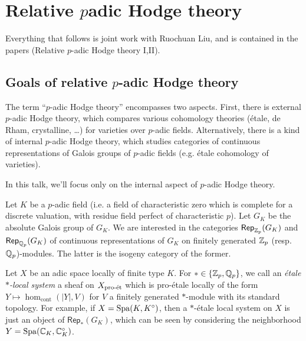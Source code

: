 




\section{Relative \texorpdfstring{$p$}-adic Hodge theory}





Everything that follows is joint work with Ruochuan Liu, and is contained 
in the papers (Relative $p$-adic Hodge theory I,II). 




\subsection{Goals of relative \texorpdfstring{$p$}{p}-adic Hodge theory}

The term ``$p$-adic Hodge theory'' encompasses two aspects. First, there is 
external $p$-adic Hodge theory, which compares various cohomology theories 
(\'etale, de Rham, crystalline, \ldots) for varieties over $p$-adic fields. 
Alternatively, there is a kind of internal $p$-adic Hodge theory, which studies 
categories of continuous representations of Galois groups of $p$-adic fields 
(e.g. \'etale cohomology of varieties). 

In this talk, we'll focus only on the internal aspect of $p$-adic Hodge theory. 

Let $K$ be a $p$-adic field (i.e. a field of characteristic zero which is complete 
for a discrete valuation, with residue field perfect of characteristic $p$). 
Let $G_K$ be the absolute Galois group of $G_K$. We are interested in the categories 
$\mathsf{Rep}_{\mathbb{Z}_p}(G_K)$ and $\mathsf{Rep}_{\mathbb{Q}_p}(G_K)$ of continuous 
representations of $G_K$ on finitely generated $\mathbb{Z}_p$ (resp. $\mathbb{Q}_p$)-modules. 
The latter is the isogeny category of the former. 

Let $X$ be an adic space locally of finite type $K$. For 
$\ast\in \{\mathbb{Z}_p,\mathbb{Q}_p\}$, we call an \emph{\'etale $\ast$-local system} a 
sheaf on $X_{\textnormal{pro-\'et}}$ which is pro-\'etale locally of the form 
$Y\mapsto \hom_\text{cont}(|Y|,V)$ for $V$ a finitely generated 
$\ast$-module with its standard topology. For example, if $X=\operatorname{Spa}(K,K^\circ)$, then a $\ast$-\'etale local system on $X$ is just an object of 
$\mathsf{Rep}_\ast(G_K)$, which can be seen by considering the 
neighborhood $Y=\operatorname{Spa}(\mathbb{C}_K,\mathbb{C}_K^\circ)$. 

